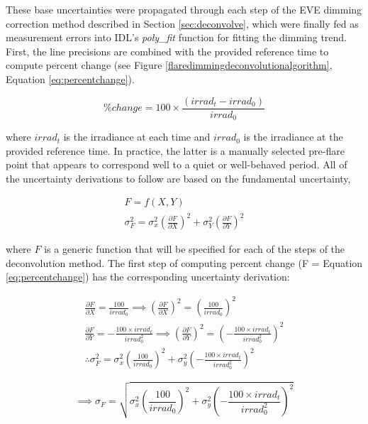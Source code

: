 These base uncertainties were propagated through each step of the EVE dimming correction method described in Section \ref{sec:deconvolve}, which were finally fed as measurement errors into IDL’s \textit{poly{\_}fit} function for fitting the dimming trend. First, the line precisions are combined with the provided reference time to compute percent change (see Figure \ref{flaredimmingdeconvolutionalgorithm}, Equation \ref{eq:percentchange}). 

\begin{equation} 
    \% change = 100 \times \frac{(irrad_t - irrad_0)}{irrad_0}
    \label{eq:percentchange}
\end{equation}

\noindent where $irrad_t$ is the irradiance at each time and $irrad_0$ is the irradiance at the provided reference time. In practice, the latter is a manually selected pre-flare point that appears to correspond well to a quiet or well-behaved period. All of the uncertainty derivations to follow are based on the fundamental uncertainty, 

\begin{gather}
    F = f(X,Y) \\
    \sigma^2_F = \sigma^2_x(\frac{\partial F}{\partial X})^2 + \sigma^2_Y(\frac{\partial F}{\partial Y})^2
    \label{eq:genericuncertainty}
\end{gather}

\noindent where $F$ is a generic function that will be specified for each of the steps of the deconvolution method. The first step of computing percent change (F = Equation \ref{eq:percentchange}) has the corresponding uncertainty derivation: 

\begin{gather*} 
    \frac{\partial F}{\partial X} = \frac{100}{irrad_0} \implies 
    (\frac{\partial F}{\partial X})^2 = (\frac{100}{irrad_0})^2 \\    
    \frac{\partial F}{\partial Y} = -\frac{100 \times irrad_t}{irrad_0^2} 
    \implies (\frac{\partial F}{\partial Y})^2 = (-\frac{100 \times irrad_t}{irrad_0^2})^2 \\
    \therefore \sigma^2_F = \sigma^2_x(\frac{100}{irrad_0})^2 + \sigma^2_y(-\frac{100 \times irrad_t}{irrad_0^2})^2
    \label{eq:percentchangeuncertaintyderivation}
\end{gather*}

\begin{equation}
    \implies \sigma _F = \sqrt{\sigma^2_x(\frac{100}{irrad_0})^2 + \sigma^2_y(-\frac{100 \times irrad_t}{irrad_0^2})^2}
    \label{eq:percentchangeuncertainty}
\end{equation}


